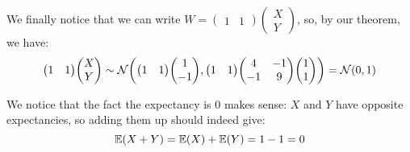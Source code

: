 \documentclass[a4paper]{article}
\begin{document}
{    We finally notice that we can write $W = \begin{pmatrix} 1 & 1 \end{pmatrix} \begin{pmatrix} X \\ Y \end{pmatrix} $, so, by our theorem, we have: 
    \[\begin{pmatrix} 1 & 1 \end{pmatrix} \begin{pmatrix} X \\ Y \end{pmatrix} \followsdistr \mathcal{N}\left(\begin{pmatrix} 1 & 1 \end{pmatrix} \begin{pmatrix} 1 \\ -1 \end{pmatrix} , \begin{pmatrix} 1 & 1 \end{pmatrix} \begin{pmatrix} 4 & -1 \\ -1 & 9 \end{pmatrix} \begin{pmatrix} 1 \\ 1 \end{pmatrix} \right) = \mathcal{N}\left(0, 1\right)\]
    
    We notice that the fact the expectancy is 0 makes sense: $X$ and $Y$ have opposite expectancies, so adding them up should indeed give: 
    \[\exval\left(X + Y\right) = \exval\left(X\right)+ \exval\left(Y\right) = 1 - 1 = 0\]
}

\end{document}
